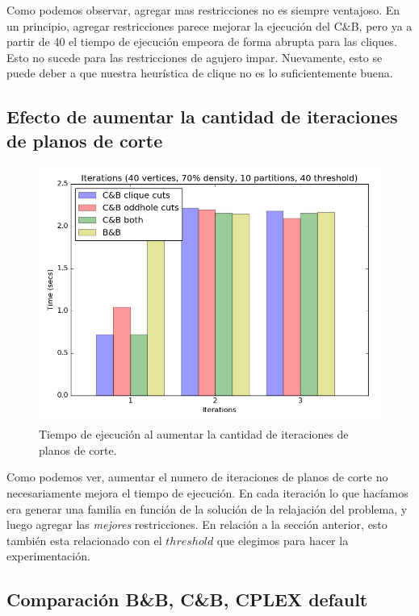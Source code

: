 Como podemos observar, agregar mas restricciones no es siempre ventajoso. En un principio, agregar restricciones parece mejorar la ejecución del C\&B, pero ya a partir de 40 el tiempo de ejecución empeora de forma abrupta para las cliques. Esto no sucede para las restricciones de agujero impar. Nuevamente, esto se puede deber a que nuestra heurística de clique no es lo suficientemente buena.

\subsection{Efecto de aumentar la cantidad de iteraciones de planos de corte}

\begin{figure}[h]
\centering
\includegraphics[scale=0.5]{img/7-iterations_v40_p10_l40_t1_b0.png}
\caption{Tiempo de ejecución al aumentar la cantidad de iteraciones de planos de corte.}
\end{figure}

Como podemos ver, aumentar el numero de iteraciones de planos de corte no necesariamente mejora el tiempo de ejecución. En cada iteración lo que hacíamos era generar una familia en función de la solución de la relajación del problema, y luego agregar las \textit{mejores} restricciones. En relación a la sección anterior, esto también esta relacionado con el $threshold$ que elegimos para hacer la experimentación.

\pagebreak

\subsection{Comparación B\&B, C\&B, CPLEX default}


